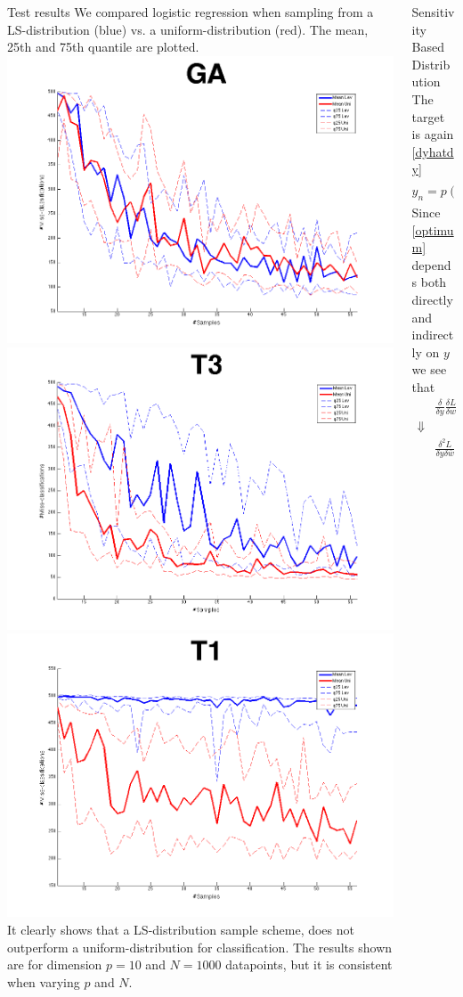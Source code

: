 \documentclass{beamer}
\newenvironment{pblock}{\begin{minipage}[b]{\linewidth}
	\begin{block}}{\end{block} 	\end{minipage}\vspace*{15pt}}
\begin{document}
{\begin{columns}[T]
\begin{column}{.69\linewidth}
\begin{columns}[t]
\begin{column}{.5\linewidth}
	\begin{pblock}{Test results}
	We compared logistic regression when sampling from a LS-distribution (blue) vs. a uniform-distribution (red). The mean, 25th and 75th quantile are plotted.
	\includegraphics[width=.33\linewidth]{GA.png}	\includegraphics[width=.33\linewidth]{T3.png}	\includegraphics[width=.33\linewidth]{T1.png}\\
	It clearly shows that a LS-distribution sample scheme, does not outperform a uniform-distribution for classification. The results shown are for dimension $p = 10$ and $N = 1000$ datapoints, but it is consistent when varying $p$ and $N$. 

	\end{pblock}

	
	
    \end{column}
    \begin{column}{.5\linewidth}
    
    
    	\begin{pblock}{Sensitivity Based Distribution}
    	The target is again \eqref{dyhatdy} 
    	\begin{equation*}
    	\label{optimum}
    	 \hat{y}_n = p(y|\bar{x},\bar{w}) \quad \bar{w} \  \text{s.t.} \ \frac{\delta L}{\delta\bar{w}}=0
    	\end{equation*}
    	Since \ref{optimum} depends both directly and indirectly on $y$ we see that
    	\begin{eqnarray*}
    	&\frac{\delta}{\delta y} \frac{\delta L}{\delta w} = 0\\
    	\Downarrow & \\
    	&\frac{\delta^2 L}{\delta y \delta \bar{w}} + \frac{\delta^2 L}{\delta \bar{w} \delta \bar{w}^T} \frac{\delta \bar{w}}{\delta y}= 0
    	\end{eqnarray*}
    	

\end{pblock}
\end{column}
\end{columns}
\end{column}
\end{columns}}
\end{document}
